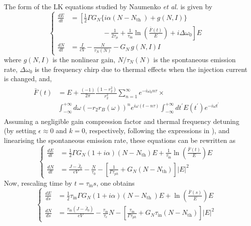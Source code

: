 The form of the LK equations studied by Naumenko \textit{et al.} \cite{naumenko2003characteristics,naumenko2004slow} is given by
\begin{equation}
\left\{
\begin{aligned}
\frac{d E}{d t} &= \left[\frac{1}{2} \Gamma G_N \big\{ i \alpha\left(N-N_{\text {th }}\right)+g(N, I) \big\} \right. \\
                &\left.\hspace{2cm} - \frac{1}{2 \tau_\mu}+\frac{1}{\tau_\text{in}} \ln \left(\frac{\bar{F}(t)}{E}\right)+i \Delta \omega_0\right] E\\
\frac{d N}{d t} &= \frac{I}{e V}-\frac{N}{\tau_N(N)}-G_N \, g(N, I) I
\end{aligned}
\right.
\end{equation}
%
where $g(N, I)$ is the nonlinear gain, $N / \tau_N(N)$ is the spontaneous emission rate, $\Delta \omega_0$ is the frequency chirp due to thermal effects when the injection current is changed, and,
%
\begin{gather}
\begin{aligned}
\bar{F}(t) &=  E+\frac{(-1)}{2 \pi} \frac{\left(1-r_2^2\right)}{r_2^2} \sum_{n=1}^{\infty} e^{-i \omega_0 n \tau} \times \\
            &\int_{-\infty}^{+\infty} d \omega\left(-r_2 r_B(\omega)\right)^n e^{i \omega(t-n \tau)} \int_{-\infty}^{+\infty} d t^{\prime} E\left(t^{\prime}\right) e^{-i \omega t^{\prime}}
\end{aligned}
\end{gather}
%
Assuming a negligible gain compression factor and thermal frequency detuning (by setting $\epsilon \approx 0$ and $k=0$, respectively, following the expressions in \cite{naumenko2003characteristics}), and linearising the spontaneous emission rate, these equations can be rewritten as
%
\begin{equation*}
\left\{\begin{aligned}
\frac{d E}{d t} &= \frac{1}{2} \Gamma G_N(1+i \alpha)\left(N-N_\text{th}\right) E + \frac{1}{\tau_\text{in}} \ln \left(\frac{\bar{F}(t)}{E}\right) E 
\\
\frac{d N}{d t} &= \frac{J-\bar{J}_0}{e V}-\frac{N}{\tau_0}-\left[\frac{1}{\Gamma \tau_{p h}} + G_N\left(N-N_\text{th}\right)\right]|E|^2
\end{aligned}\right.
\end{equation*}
%
Now, rescaling time by $t=\tau_\text{in} s$, one obtains
%
\begin{equation*}
\left\{\begin{aligned}
\frac{d E}{d s} &= \frac{1}{2} \tau_\text{in} \Gamma G_N(1+i \alpha)\left(N-N_{\text {th }}\right) E + \ln \left(\frac{\bar{F}(s)}{E}\right) E
\\
\frac{d N}{d s} &= \frac{\tau_{\text{in}}\left(J-\bar{J}_0\right)}{e V}-\frac{\tau_\text{in}}{\tau_e} N-\left[\frac{\tau_\text{in}}{\Gamma \tau_{ph}}+G_N \tau_\text{in}\left(N-N_{\text{th}}\right)\right]|E|^2
\end{aligned}\right.
\end{equation*}
